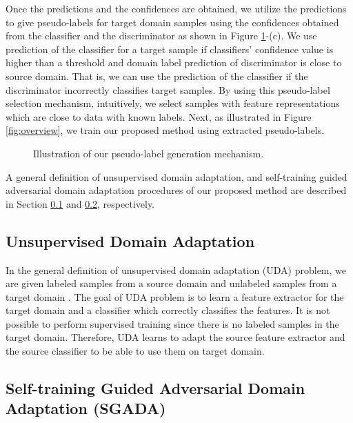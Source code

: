 \documentclass[final]{cvpr}
\begin{document}
Once the predictions and the confidences are obtained, we utilize the predictions to give pseudo-labels for target domain samples using the confidences obtained from the classifier  and the discriminator  as shown in Figure \ref{fig:adda}-(c). We use prediction of the classifier for a target sample if classifiers' confidence value is higher than a threshold and domain label prediction of discriminator is close to source domain. That is, we can use the prediction of the classifier if the discriminator incorrectly classifies target samples. By using this pseudo-label selection mechanism, intuitively, we select samples with feature representations which are close to data with known labels. Next, as illustrated in Figure \ref{fig:overview}, we train our proposed method using extracted pseudo-labels.

\begin{figure}[t]
\centering
    \vspace{2mm}
    \caption{Illustration of our pseudo-label generation mechanism.}
    \label{fig:adda}
\end{figure}

A general definition of unsupervised domain adaptation, and self-training guided adversarial domain adaptation procedures of our proposed method are described in Section \ref{sec:uda} and \ref{sec:selftraining}, respectively.

\subsection{Unsupervised Domain Adaptation}
\label{sec:uda}

In the general definition of unsupervised domain adaptation (UDA) problem, we are given  labeled samples from a source domain  and  unlabeled samples from a target domain . The goal of UDA problem is to learn a feature extractor  for the target domain and a classifier  which correctly classifies the features. It is not possible to perform supervised training since there is no labeled samples in the target domain. Therefore, UDA learns to adapt the source feature extractor  and the source classifier  to be able to use them on target domain.

\subsection{Self-training Guided Adversarial Domain Adaptation (SGADA)}
\label{sec:selftraining}
\end{document}
